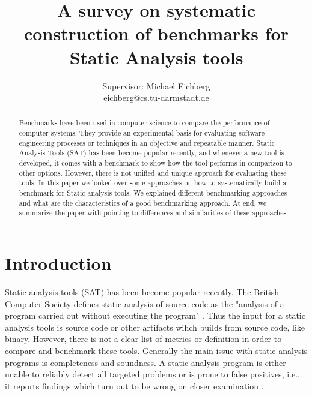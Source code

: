 \documentclass[authoryear,preprint]{sigplanconf}
\begin{document}
	
	\setlength{\pdfpageheight}{\paperheight}
	\setlength{\pdfpagewidth}{\paperwidth}
	
	
	\title{A survey on systematic construction of benchmarks for Static Analysis tools}
	\subtitle{Supervisor: Michael Eichberg \\ eichberg@cs.tu-darmstadt.de}
	
	
	\maketitle


\begin{abstract}
	Benchmarks have been used in computer science to compare the performance of computer systems. They provide an experimental basis for evaluating software engineering processes or techniques in an objective and repeatable manner. Static Analysis Tools (SAT) has been become popular recently, and whenever a new tool is developed, it comes with a benchmark to show how the tool performs in comparison to other options. However, there is not unified and unique approach for evaluating these tools. In this paper we looked over some approaches on how to systematically build a benchmark for Static analysis tools. We explained different benchmarking approaches and what are the characteristics of a good benchmarking approach. At end, we summarize the paper with pointing to differences and similarities of these approaches.
\end{abstract}

\section{Introduction}
\label{sec:introduction}
Static analysis tools (SAT) has been become popular recently. The British Computer Society defines static analysis of source code as the "analysis of a program carried out without executing the program" \cite{Glossary_of_term}. Thus the input for a static analysis tools is source code or other artifacts wihch builds from source code, like binary. However, there is not a clear list of metrics or definition in order to compare and benchmark these tools. Generally the main issue with static analysis programs is completeness and soundness. A static analysis program is either unable to reliably detect all targeted problems or is prone to false positives, i.e., it reports findings which turn out to be wrong on closer examination \cite{Scanstud}. 
\end{document}

